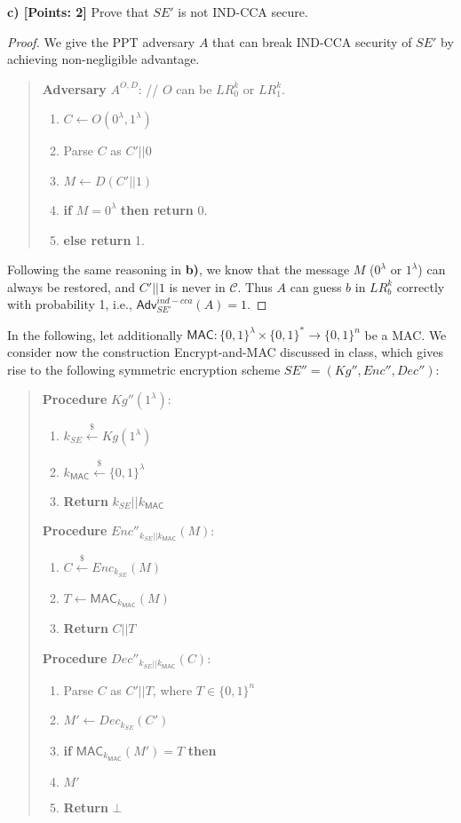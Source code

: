 \documentclass[12pt]{article}
\newcommand{\bits}{\{0,1\}}
\newcommand{\getsr}{\stackrel{\$}{\gets}}
\newcommand{\Adv}{\textsf{Adv}}
\newcommand{\tab}{\hspace{0.3in}}
\newcommand{\MAC}{\textsf{MAC}}
\newcommand{\C}{\mathcal{C}}
\theoremstyle{definition}
\begin{document}
{\bf c) [Points: 2]} Prove that $SE'$ is not IND-CCA secure.
\begin{proof}
We give the PPT adversary $A$ that can break IND-CCA security of $SE'$ by achieving non-negligible advantage.
\begin{quote}
{\bf Adversary} $A^{O, D}$: // $O$ can be $LR_0^k$ or $LR_1^k$.
\begin{enumerate}
\item $C \gets O(0^\lambda, 1^\lambda)$
\item Parse $C$ as $C'||0$
\item $M \gets D(C'||1)$
\item {\bf if} $M=0^\lambda$ {\bf then return} 0.
\item {\bf else return} 1.
\end{enumerate}
\end{quote}
Following the same reasoning in {\bf b)}, we know that the message $M$ ($0^\lambda$ or $1^\lambda$) can always be restored, and $C'||1$ is never in $\C$. Thus $A$ can guess $b$ in $LR_b^k$ correctly with probability 1, i.e., $\Adv_{SE'}^{ind-cca}(A) = 1$.
\end{proof}

In the following, let additionally $\MAC : \bits^\lambda \times \bits^* \to \bits^n$ be a MAC. We consider now the construction Encrypt-and-MAC discussed in class, which gives rise to the following symmetric encryption scheme $SE'' = (Kg'', Enc'', Dec'')$:
\begin{quote}
\begin{minipage}[t]{.3\textwidth}
{\bf Procedure} $Kg''(1^\lambda)$:
\begin{enumerate}
\item $k_{SE} \getsr Kg(1^\lambda)$
\item $k_{\MAC} \getsr \bits^\lambda$
\item {\bf Return} $k_{SE}||k_{\MAC}$
\end{enumerate}
\end{minipage}
\begin{minipage}[t]{.5\textwidth}
{\bf Procedure} $Enc''_{k_{SE}||k_{\MAC}}(M)$:
\begin{enumerate}
\item $C \getsr Enc_{k_{SE}} (M)$
\item $T \gets \MAC_{k_{\MAC}}(M)$
\item {\bf Return} $C||T$
\end{enumerate}
\end{minipage}

\begin{minipage}[t]{.5\textwidth}
{\bf Procedure} $Dec''_{k_{SE}||k_{\MAC}}(C)$:
\begin{enumerate}
\item Parse $C$ as $C'||T$, where $T \in \bits^n$
\item $M' \gets Dec_{k_{SE}} (C')$
\item {\bf if} $\MAC_{k_{\MAC}}(M') = T$ {\bf then}
\item \tab {\bf Return} $M'$
\item {\bf Return} $\bot$
\end{enumerate}
\end{minipage}
\end{quote}
\end{document}
